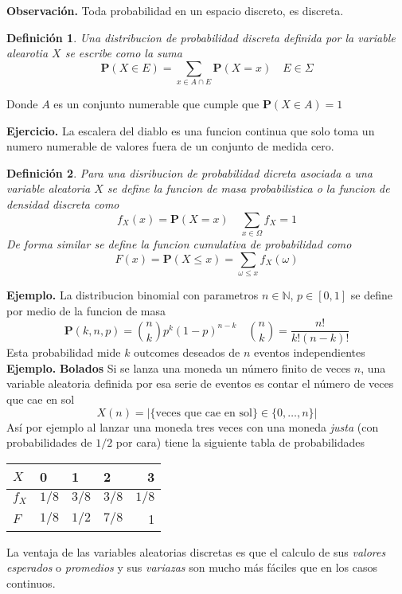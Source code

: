 \documentclass[letterpaper]{book}
\newtheorem{def.}{Definici\'on}[section]
\newcommand{\nat}{\ensuremath{ \mathbb N }}
\newcommand{\prob}{\textbf{P}}
\newcommand{\eje}{{\newline \noindent \sc \textbf{Ejercicio. }}}
\newcommand{\exe}{{\newline \noindent \sc \textbf{Ejemplo. }}}
\newcommand{\obs}{{\newline \noindent \sc \textbf{Observación. }}}
\newcommand{\om}{\ensuremath{\Omega}}
\newcommand{\sig}{\ensuremath{\Sigma}}
\begin{document}
\obs Toda probabilidad en un espacio discreto, es discreta.
\begin{def.}
Una distribucion de probabilidad discreta definida por la variable alearotia \(X\) se escribe como la suma
\[
    \prob(X\in E)=\sum_{x\in A\cap E}\prob(X=x)\quad E\in\sig
\]
\end{def.}
Donde \(A\) es un conjunto numerable que cumple que \(\prob(X\in A)=1\)

\eje La escalera del diablo es una funcion continua que solo toma un numero numerable de valores fuera de un conjunto de medida cero.

\begin{def.}
Para una disribucion de probabilidad dicreta asociada a una variable aleatoria \(X\) se define la \emph{funcion de masa probabilistica} o la \emph{funcion de densidad discreta} como
\[
        f_{X}(x)=\prob(X=x)\quad\sum_{x\in\om}f_{X}=1
\]
De forma similar se define la \emph{funcion cumulativa de probabilidad} como
\[
        F(x)=\prob(X\leq x)=\sum_{\omega\leq x}f_{X}(\omega)
\]
\end{def.}

\exe La distribucion binomial con parametros \(n\in\nat\), \(p\in[0,1]\) se define por medio de la funcion de masa
\[
    \prob(k,n,p)={n\choose k}p^{k}(1-p)^{n-k}\quad{n\choose k}=\frac{n!}{k!(n-k)!}
\]
Esta probabilidad mide \(k\) outcomes deseados de \(n\) eventos independientes
\exe \textbf{Bolados} Si se lanza una moneda un número finito de veces \(n\), una variable aleatoria definida por esa serie de eventos es contar el número de veces que cae en sol
\[
    X(n)=|\{\text{veces que cae en sol}\}\in\{0,\dots,n\}|
\]
\noindent Así por ejemplo al lanzar una moneda tres veces con una moneda \emph{justa} (con probabilidades de \(1/2\) por cara) tiene la siguiente tabla de probabilidades

\begin{center}
\begin{tabular}{llllr}
\(X\) & 0 & 1 & 2 & 3\\
\hline
\(f_X\) & \(1/8\) & \(3/8\) & \(3/8\) & \(1/8\)\\
\(F\) & \(1/8\) & \(1/2\) & \(7/8\) & 1\\
\end{tabular}
\end{center}

La ventaja de las variables aleatorias discretas es que el calculo de sus \emph{valores esperados} o \emph{promedios} y sus \emph{variazas} son mucho más fáciles que en los casos continuos.
\end{document}

